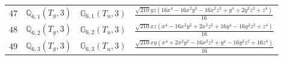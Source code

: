 \documentclass[fleqn,8pt,landscape]{jsarticle}
\begin{document}
\begin{table}[ht!]
\begin{center}
\begin{tabular}{cccl}
$ 47 $ & $ \mathbb{Q}_{6,1}(T_{g},3) $ & $ \mathbb{G}_{6,1}(T_{u},3) $ & $ \frac{\sqrt{210} y z \left(16 x^{4} - 16 x^{2} y^{2} - 16 x^{2} z^{2} + y^{4} + 2 y^{2} z^{2} + z^{4}\right)}{16} $ \\
$ 48 $ & $ \mathbb{Q}_{6,2}(T_{g},3) $ & $ \mathbb{G}_{6,2}(T_{u},3) $ & $ \frac{\sqrt{210} x z \left(x^{4} - 16 x^{2} y^{2} + 2 x^{2} z^{2} + 16 y^{4} - 16 y^{2} z^{2} + z^{4}\right)}{16} $ \\
$ 49 $ & $ \mathbb{Q}_{6,3}(T_{g},3) $ & $ \mathbb{G}_{6,3}(T_{u},3) $ & $ \frac{\sqrt{210} x y \left(x^{4} + 2 x^{2} y^{2} - 16 x^{2} z^{2} + y^{4} - 16 y^{2} z^{2} + 16 z^{4}\right)}{16} $ \\
 \hline \hline
\end{tabular}
\end{center}
\end{table}
\end{document}
